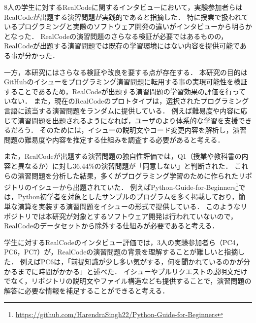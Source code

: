 8人の学生に対するRealCodeに関するインタビューにおいて，実験参加者らはRealCodeが出題する演習問題が実践的であると指摘した．
特に授業で扱われているプログラミングと実際のソフトウェア開発の違いがインタビューから明らかとなった．
RealCodeの演習問題のさらなる検証が必要ではあるものの，RealCodeが出題する演習問題では既存の学習環境にはない内容を提供可能である事が分かった．



一方，本研究にはさらなる検証や改良を要する点が存在する．
本研究の目的はGitHubのイシューをプログラミング演習問題に転用する事の実現可能性を検証することであるため，RealCodeが出題する演習問題の学習効果の評価を行っていない．
また，現在のRealCodeのプロトタイプは，選択されたプログラミング言語に該当する演習問題をランダムに提供している．
例えば難易度や内容に応じて演習問題を出題されるようになれば，ユーザのより体系的な学習を支援できるだろう．
そのためには，イシューの説明文やコード変更内容を解析し，演習問題の難易度や内容を推定する仕組みを調査する必要があると考える．

また，RealCodeが出題する演習問題の独自性評価では，Q1（授業や教科書の内容と異なるか）に対し36.44\%の演習問題が「同意しない」と判断された．
これらの演習問題を分析した結果，多くがプログラミング学習のために作られたリポジトリのイシューから出題されていた．
例えばPython-Guide-for-Beginners\footnote{\url{https://github.com/HarendraSingh22/Python-Guide-for-Beginners}}では，Python初学者を対象としたサンプルのプログラムを多く掲載しており，簡単な演算を実装する演習問題をイシューの形式で提供している．
このようなリポジトリでは本研究が対象とするソフトウェア開発は行われていないので，RealCodeのデータセットから除外する仕組みが必要であると考える．

学生に対するRealCodeのインタビュー評価では，3人の実験参加者ら（PC4，PC6，PC7）が，RealCodeの演習問題の背景を理解することが難しいと指摘した．
例えばPC6は，「前提知識が少し多い気がする，何を聞かれているのかが分かるまでに時間がかかる」と述べた．
イシューやプルリクエストの説明文だけでなく，リポジトリの説明文やファイル構造なども提供することで，演習問題の解答に必要な情報を補足することができると考える．



